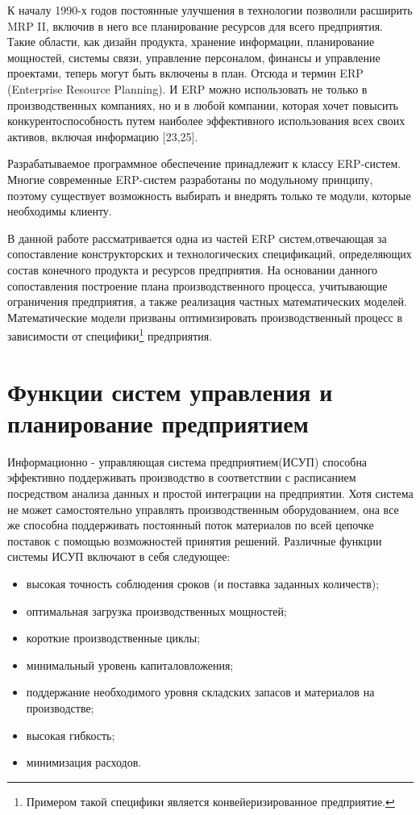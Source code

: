 К началу 1990-х годов постоянные улучшения в технологии позволили расширить MRP II, включив в него все планирование ресурсов для всего предприятия. Такие области, как дизайн продукта, хранение информации, планирование мощностей, системы связи, управление персоналом, финансы и управление проектами, теперь могут быть включены в план. Отсюда и термин ERP (Enterprise Resource Planning). И ERP можно использовать не только в производственных компаниях, но и в любой компании, которая хочет повысить конкурентоспособность путем наиболее эффективного использования всех своих активов, включая информацию \cite{ptak_schragenheim_2004} [23,25].

Разрабатываемое программное обеспечение принадлежит к классу ERP-систем. Многие современные ERP-систем разработаны по модульному принципу, поэтому существует возможность выбирать и внедрять только те модули, которые необходимы клиенту. 

В данной работе рассматривается одна из частей ERP систем,отвечающая за сопоставление конструкторских и технологических спецификаций, определяющих состав конечного продукта и ресурсов предприятия. На основании данного сопоставления построение плана производственного процесса, учитывающие ограничения предприятия, а также реализация частных математических моделей. Математические модели призваны оптимизировать производственный процесс в зависимости от специфики\footnote{Примером такой специфики является конвейеризированное предприятие.} предприятия.

\section{Функции систем управления и планирование предприятием}

Информационно - управляющая система предприятием(ИСУП) способна эффективно поддерживать производство в соответствии с расписанием посредством анализа данных и простой интеграции на предприятии. Хотя система не может самостоятельно управлять производственным оборудованием, она все же способна поддерживать постоянный поток материалов по всей цепочке поставок с помощью возможностей принятия решений. Различные функции системы ИСУП включают в себя следующее:

\begin{itemize}
    \item  высокая точность соблюдения сроков (и поставка заданных количеств);
    \item   оптимальная загрузка производственных мощностей;
    \item короткие производственные циклы;
    \item минимальный уровень капиталовложения;
    \item поддержание необходимого уровня складских запасов и материалов на производстве;
    \item   высокая гибкость;
    \item    минимизация расходов.
\end{itemize}

